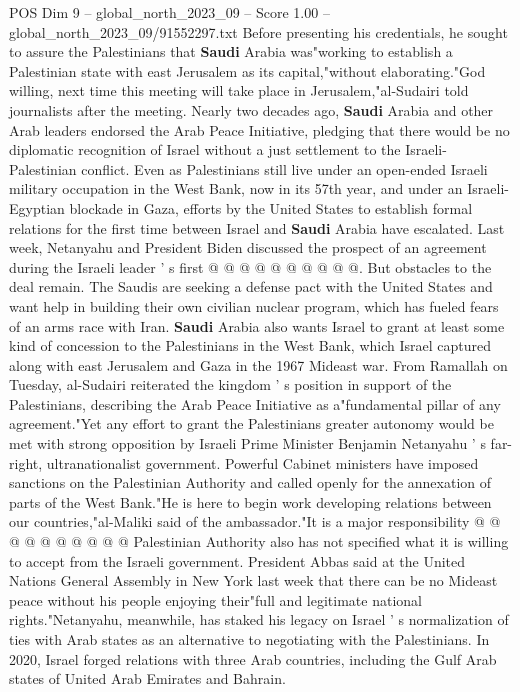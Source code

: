 \begin{textsample}{POS Dim 9 – global\_north\_2023\_09 – Score 1.00 – global\_north\_2023\_09/91552297.txt}
Before presenting his credentials, he sought to assure the Palestinians that \textbf{Saudi} Arabia was"working to establish a Palestinian state with east Jerusalem as its capital,"without elaborating."God willing, next time this meeting will take place in Jerusalem,"al-Sudairi told journalists after the meeting.
Nearly two decades ago, \textbf{Saudi} Arabia and other Arab leaders endorsed the Arab Peace Initiative, pledging that there would be no diplomatic recognition of Israel without a just settlement to the Israeli-Palestinian conflict.
Even as Palestinians still live under an open-ended Israeli military occupation in the West Bank, now in its 57th year, and under an Israeli-Egyptian blockade in Gaza, efforts by the United States to establish formal relations for the first time between Israel and \textbf{Saudi} Arabia have escalated.
Last week, Netanyahu and President Biden discussed the prospect of an agreement during the Israeli leader ' s first @ @ @ @ @ @ @ @ @ @.
But obstacles to the deal remain.
The Saudis are seeking a defense pact with the United States and want help in building their own civilian nuclear program, which has fueled fears of an arms race with Iran. \textbf{Saudi} Arabia also wants Israel to grant at least some kind of concession to the Palestinians in the West Bank, which Israel captured along with east Jerusalem and Gaza in the 1967 Mideast war.
From Ramallah on Tuesday, al-Sudairi reiterated the kingdom ' s position in support of the Palestinians, describing the Arab Peace Initiative as a"fundamental pillar of any agreement."Yet any effort to grant the Palestinians greater autonomy would be met with strong opposition by Israeli Prime Minister Benjamin Netanyahu ' s far-right, ultranationalist government.
Powerful Cabinet ministers have imposed sanctions on the Palestinian Authority and called openly for the annexation of parts of the West Bank."He is here to begin work developing relations between our countries,"al-Maliki said of the ambassador."It is a major responsibility @ @ @ @ @ @ @ @ @ @ Palestinian Authority also has not specified what it is willing to accept from the Israeli government.
President Abbas said at the United Nations General Assembly in New York last week that there can be no Mideast peace without his people enjoying their"full and legitimate national rights."Netanyahu, meanwhile, has staked his legacy on Israel ' s normalization of ties with Arab states as an alternative to negotiating with the Palestinians.
In 2020, Israel forged relations with three Arab countries, including the Gulf Arab states of United Arab Emirates and Bahrain.

\end{textsample}
